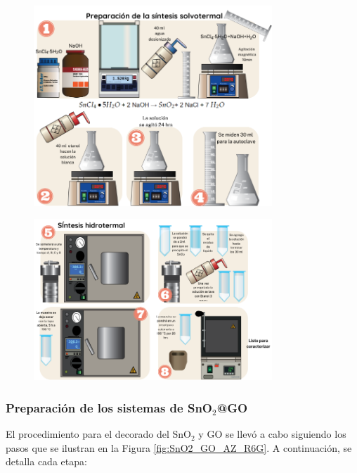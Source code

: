 \documentclass[12pt]{article}
\begin{document}
        \begin{figure}[H]
        	\begin{center}
         		\includegraphics[width = 0.8\textwidth]{Imagenes/SnO2_sintesis_1.png}
        	\end{center} 
        \end{figure}
        \begin{figure}[H]
        	\begin{center}
         		\includegraphics[width = 0.8\textwidth]{Imagenes/SnO2_sintesis_2.png}
        	\end{center} 
        \end{figure}
    
        \subsubsection{Preparación de los sistemas de SnO$\displaystyle _{2}$@GO}
        El procedimiento para el decorado del SnO$\displaystyle _{2}$ y GO se llevó a cabo siguiendo los pasos que se ilustran en la Figura \ref{fig:SnO2_GO_AZ_R6G}. A continuación, se detalla cada etapa:
        
\end{document}
